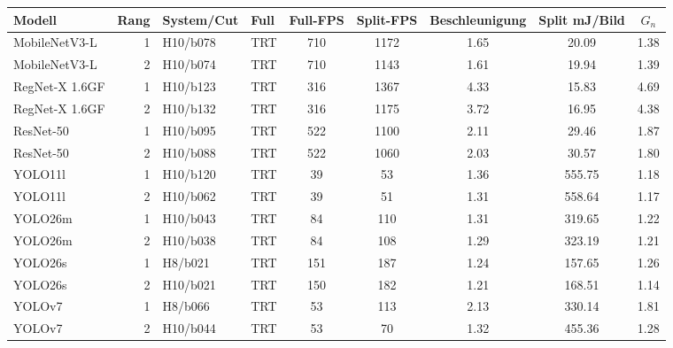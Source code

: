 \begin{tabular}{l r l l S[table-format=4.0] S[table-format=4.0] S[table-format=2.2] S[table-format=4.2] S[table-format=2.2]}
\toprule
Modell & Rang & System/Cut & Full & {Full-FPS} & {Split-FPS} & {Beschleunigung} & {Split mJ/Bild} & {$G_n$} \\
\midrule
MobileNetV3-L & 1 & H10/b078 & TRT & 710 & 1172 & 1.65 & 20.09 & 1.38 \\
MobileNetV3-L & 2 & H10/b074 & TRT & 710 & 1143 & 1.61 & 19.94 & 1.39 \\
RegNet-X 1.6GF & 1 & H10/b123 & TRT & 316 & 1367 & 4.33 & 15.83 & 4.69 \\
RegNet-X 1.6GF & 2 & H10/b132 & TRT & 316 & 1175 & 3.72 & 16.95 & 4.38 \\
ResNet-50 & 1 & H10/b095 & TRT & 522 & 1100 & 2.11 & 29.46 & 1.87 \\
ResNet-50 & 2 & H10/b088 & TRT & 522 & 1060 & 2.03 & 30.57 & 1.80 \\
YOLO11l & 1 & H10/b120 & TRT & 39 & 53 & 1.36 & 555.75 & 1.18 \\
YOLO11l & 2 & H10/b062 & TRT & 39 & 51 & 1.31 & 558.64 & 1.17 \\
YOLO26m & 1 & H10/b043 & TRT & 84 & 110 & 1.31 & 319.65 & 1.22 \\
YOLO26m & 2 & H10/b038 & TRT & 84 & 108 & 1.29 & 323.19 & 1.21 \\
YOLO26s & 1 & H8/b021 & TRT & 151 & 187 & 1.24 & 157.65 & 1.26 \\
YOLO26s & 2 & H10/b021 & TRT & 150 & 182 & 1.21 & 168.51 & 1.14 \\
YOLOv7 & 1 & H8/b066 & TRT & 53 & 113 & 2.13 & 330.14 & 1.81 \\
YOLOv7 & 2 & H10/b044 & TRT & 53 & 70 & 1.32 & 455.36 & 1.28 \\
\bottomrule
\end{tabular}
